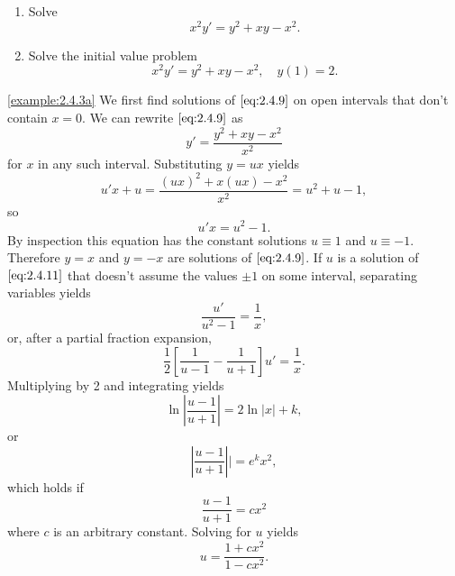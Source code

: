 \documentclass{ximera}
\begin{document}
\begin{example}\label{example:2.4.3}

\begin{enumerate}
\item\label{example:2.4.3a} %
Solve
\begin{equation} \label{eq:2.4.9}
x^2y'=y^2+xy-x^2.
\end{equation}

\item\label{example:2.4.3b} %
Solve the initial value problem
\begin{equation} \label{eq:2.4.10}
x^2y'=y^2+xy-x^2, \quad y(1)=2.
\end{equation}
\end{enumerate}

\begin{explanation}
\ref{example:2.4.3a} We first find solutions of $\eqref{eq:2.4.9}$ on open intervals that don't
contain $x=0$. We can rewrite $\eqref{eq:2.4.9}$ as
$$
y'=\frac{y^2+xy-x^2}{x^2}
$$
for $x$ in any such interval. Substituting $y=ux$ yields
$$
u'x+u =\frac{(ux)^2+x(ux)-x^2}{x^2}
= u^2+u-1,
$$
so
\begin{equation} \label{eq:2.4.11}
u'x=u^2-1.
\end{equation}
By inspection this equation has the constant solutions $u\equiv1$ and
$u\equiv-1$. Therefore $y=x$ and $y=-x$ are solutions of
$\eqref{eq:2.4.9}$. If $u$ is a solution of $\eqref{eq:2.4.11}$ that doesn't
assume the values $\pm 1$ on some interval,  separating variables
yields
$$
\frac{u'}{u^2-1}=\frac{1}{x},
$$
 or, after a partial fraction expansion,
$$
{\frac{1}{2}}\left[\frac{1}{u-1}-\frac{1}{u+1}\right]u'=
\frac{1}{x}.
$$
 Multiplying by 2 and integrating yields
$$
\ln\left|\frac{u-1}{u+1}\right| =2 \ln |x|+k,
$$
 or
$$
\left|\frac{u-1}{u+1}\right||=e^kx^2,
$$
which holds if
\begin{equation} \label{eq:2.4.12}
\frac{u-1}{u+1}=cx^2
\end{equation}
where $c$ is an arbitrary constant.
  Solving for $u$ yields
$$
u =\frac{1+cx^2}{1-cx^2}.
$$



  



\end{explanation}
\end{example}
\end{document}
